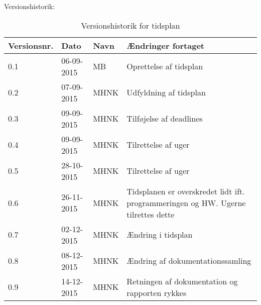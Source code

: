 \documentclass[landscape, 12pt, letterpaper]{article}
\begin{document}
\begin{table}[]
Versionshistorik:
\centering
\caption{Versionshistorik for tidsplan}
\label{my-label}
\begin{tabular}{|l|l|l|l|}
\hline
Versionsnr. & Dato       & Navn & Ændringer fortaget     \\ \hline
0.1         & 06-09-2015 & MB   & Oprettelse af tidsplan \\ \hline
0.2         & 07-09-2015 & MHNK & Udfyldning af tidsplan \\ \hline
0.3         & 09-09-2015 & MHNK & Tilføjelse af deadlines\\ \hline
0.4         & 09-09-2015 & MHNK & Tilrettelse af uger    \\ \hline
0.5         & 28-10-2015 & MHNK & Tilrettelse af uger    \\ \hline
0.6         & 26-11-2015 & MHNK & Tidsplanen er overskredet lidt ift. programmeringen og HW.
 Ugerne tilrettes dette     \\ \hline	
0.7         & 02-12-2015 & MHNK & Ændring i tidsplan    \\ \hline
0.8         & 08-12-2015 & MHNK & Ændring af dokumentationssamling    \\ \hline
0.9         & 14-12-2015 & MHNK & Retningen af dokumentation og rapporten rykkes   \\ \hline
\end{tabular}
\end{table}
\end{document}
